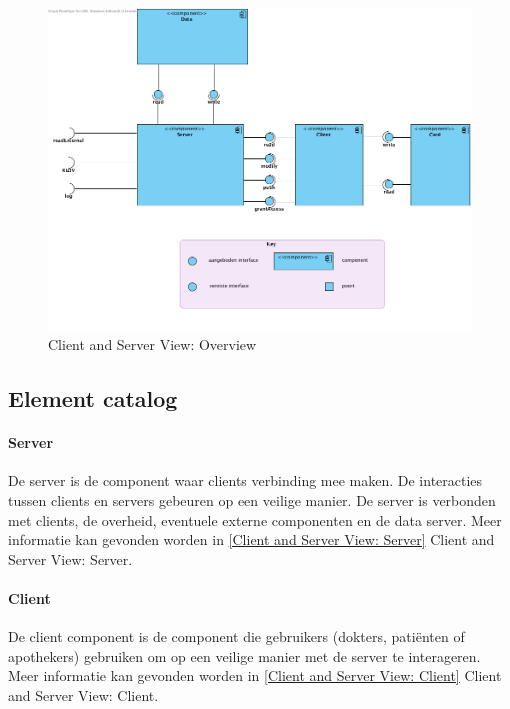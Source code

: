 \documentclass[a4paper,10pt]{article}
\begin{document}
\begin{figure}[!ht]
  \includegraphics[width=\textwidth]{../images/ClientServer_Overview.png}
  \caption{Client and Server View: Overview}
\end{figure}


\subsection{Element catalog}

\paragraph{Server}
De server is de component waar clients verbinding mee maken.  De interacties tussen clients en servers gebeuren op een veilige manier.  De server is verbonden met clients, de overheid, eventuele externe componenten en de data server.  Meer informatie kan gevonden worden in \ref{Client and Server View: Server} Client and Server View: Server.

\paragraph{Client}
De client component is de component die gebruikers (dokters, pati\"{e}nten of apothekers) gebruiken om op een veilige manier met de server te interageren.  Meer informatie kan gevonden worden in \ref{Client and Server View: Client} Client and Server View: Client.
\end{document}
